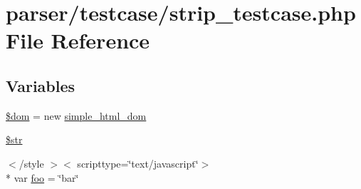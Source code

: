 \hypertarget{strip__testcase_8php}{\section{parser/testcase/strip\+\_\+testcase.php File Reference}
\label{strip__testcase_8php}
}
\subsection*{Variables}
\begin{DoxyCompactItemize}
\item 
\hyperlink{strip__testcase_8php_a46127a794280dd592812c25b62af34b0}{\$dom} = new \hyperlink{classsimple__html__dom}{simple\+\_\+html\+\_\+dom}
\item 
\hyperlink{strip__testcase_8php_a7542d95618011800c61773127fa625cf}{\$str}
\item 
$<$/style $>$$<$ scripttype=\char`\"{}text/javascript\char`\"{}$>$\\*
 var \hyperlink{strip__testcase_8php_aa901575d6c772d2340f7e16cf7028985}{foo} = \char`\"{}bar\char`\"{}
\end{DoxyCompactItemize}


